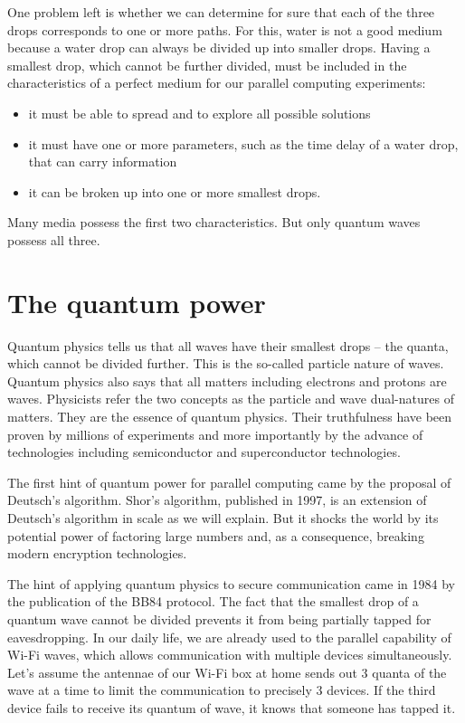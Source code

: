 One problem left is whether we can determine for sure that each of the three drops corresponds to one or more paths. For this, water is not a good medium because a water drop can always be divided up into smaller drops. Having a smallest drop, which cannot be further divided, must be included in the characteristics of a perfect medium for our parallel computing experiments:
\begin{itemize}
    \item it must be able to spread and to explore all possible solutions
    \item it must have one or more parameters, such as the time delay of a water drop, that can carry information
    \item it can be broken up into one or more smallest drops.
\end{itemize}
Many media possess the first two characteristics. But only quantum waves possess all three.

\section{The quantum power}
Quantum physics tells us that all waves have their smallest drops -- the quanta, which cannot be divided further. This is the so-called particle nature of waves. Quantum physics also says that all matters including electrons and protons are waves. Physicists refer the two concepts as the particle and wave dual-natures of matters. They are the essence of quantum physics. Their truthfulness have been proven by millions of experiments and more importantly by the advance of technologies including semiconductor and superconductor technologies.

The first hint of quantum power for parallel computing came by the proposal of Deutsch's algorithm\cite{1985Deutsch}. Shor's algorithm, published in 1997, is an extension of Deutsch's algorithm in scale as we will explain. But it shocks the world by its potential power of factoring large numbers and, as a consequence, breaking modern encryption technologies.

The hint of applying quantum physics to secure communication came in 1984 by the publication of the BB84 protocol\cite{BB84}. The fact that the smallest drop of a quantum wave cannot be divided prevents it from being partially tapped for eavesdropping. In our daily life, we are already used to the parallel capability of Wi-Fi waves, which allows communication with multiple devices simultaneously. Let's assume the antennae of our Wi-Fi box at home sends out 3 quanta of the wave at a time to limit the communication to precisely 3 devices. If the third device fails to receive its quantum of wave, it knows that someone has tapped it.

